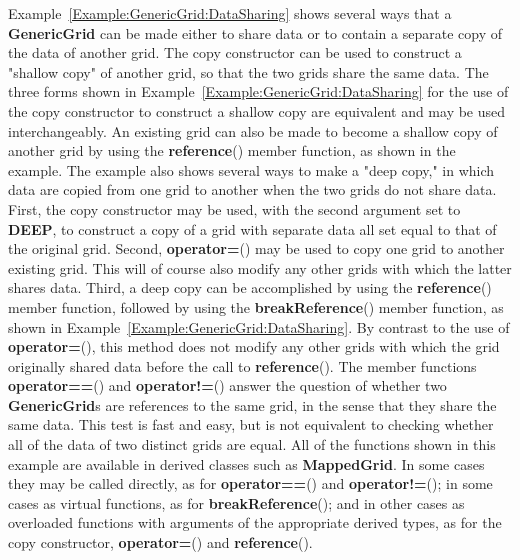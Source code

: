 \documentclass{article}
\begin{document}
Example~\ref{Example:GenericGrid:DataSharing} shows several
ways that a \textbf{GenericGrid} can be made either to share data or to contain
a separate copy of the data of another grid.  The copy constructor can be used
to construct a "shallow copy" of another grid, so that the two grids share
the same data.  The three forms shown in Example~\ref{Example:GenericGrid:DataSharing}
for the use of the copy constructor to construct a shallow copy are equivalent
and may be used interchangeably.  An existing grid can also be made to
become a shallow copy of another grid by using the \textbf{reference}()
member function, as shown in the example.
The example also shows several ways to make a "deep copy," in which data are
copied from one grid to another when the two grids do not share data.  First,
the copy constructor may be used, with the second argument set to \textbf{DEEP},
to construct a copy of a grid with separate data all set equal to that of the
original grid.  Second, \textbf{operator=}() may be used to copy one grid
to another existing grid.  This will of course also modify any other grids
with which the latter shares data.  Third, a deep copy can be accomplished by
using the \textbf{reference}() member function, followed by using the
\textbf{breakReference}() member function, as shown in
Example~\ref{Example:GenericGrid:DataSharing}.  By contrast to
the use of \textbf{operator=}(), this method does not modify any other grids
with which the grid originally shared data before the call to \textbf{reference}().
The member functions \textbf{operator==}() and \textbf{operator!=}()
answer the question of whether two \textbf{GenericGrid}s are references
to the same grid, in the sense that they share the same data.  This test is
fast and easy, but is not equivalent to checking whether all of the data of
two distinct grids are equal.  All of the functions shown in this example are
available in derived classes such as \textbf{MappedGrid}.  In some cases they
may be called directly, as for \textbf{operator==}() and
\textbf{operator!=}(); in some cases as virtual functions,
as for \textbf{breakReference}(); and in other cases as overloaded functions
with arguments of the appropriate derived types, as for the copy constructor,
\textbf{operator=}() and \textbf{reference}().
\end{document}
